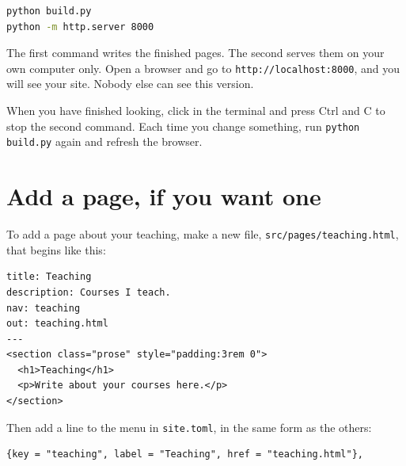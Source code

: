 \begin{lstlisting}[language=bash]
python build.py
python -m http.server 8000
\end{lstlisting}

The first command writes the finished pages. The second serves them on your own computer only. Open a browser and go to \texttt{http://localhost:8000}, and you will see your site. Nobody else can see this version.

When you have finished looking, click in the terminal and press Ctrl and C to stop the second command. Each time you change something, run \texttt{python build.py} again and refresh the browser.

\section{Add a page, if you want one}

To add a page about your teaching, make a new file, \texttt{src/pages/teaching.html}, that begins like this:

\begin{lstlisting}[language=text]
title: Teaching
description: Courses I teach.
nav: teaching
out: teaching.html
---
<section class="prose" style="padding:3rem 0">
  <h1>Teaching</h1>
  <p>Write about your courses here.</p>
</section>
\end{lstlisting}

Then add a line to the menu in \texttt{site.toml}, in the same form as the others:

\begin{lstlisting}[language=text]
{key = "teaching", label = "Teaching", href = "teaching.html"},
\end{lstlisting}
